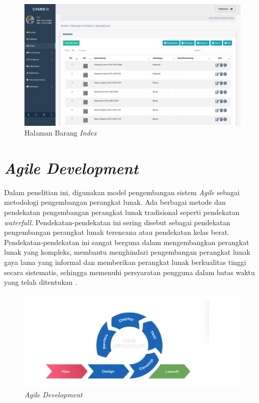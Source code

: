 \begin{enumerate}
	      \begin{figure}[h]
		      \centering
		      \includegraphics[width=0.82\linewidth]{konten//gambar/barang.png}
		      \caption{Halaman Barang \textit{Index}}
		      \label{fig:enter-label}
	      \end{figure}

\end{enumerate}

\section{\textit{Agile Development}}
Dalam penelitian ini, digunakan model pengembangan sistem \textit{Agile} sebagai metodologi pengembangan perangkat lunak. Ada berbagai metode dan pendekatan pengembangan perangkat lunak tradisional seperti pendekatan \textit{waterfall}. Pendekatan-pendekatan ini sering disebut sebagai pendekatan pengembangan perangkat lunak terencana atau pendekatan kelas berat. Pendekatan-pendekatan ini sangat berguna dalam mengembangkan perangkat lunak yang kompleks, membantu menghindari pengembangan perangkat lunak gaya lama yang informal dan memberikan perangkat lunak berkualitas tinggi secara sistematis, sehingga memenuhi persyaratan pengguna dalam batas waktu yang telah ditentukan \cite{al2020agile}.

\begin{figure}[h]
	\centering
	\includegraphics[width=0.82\linewidth]{konten//gambar/agile.png}
	\caption{\textit{Agile Development}}
	\label{fig:enter-label}
\end{figure}

